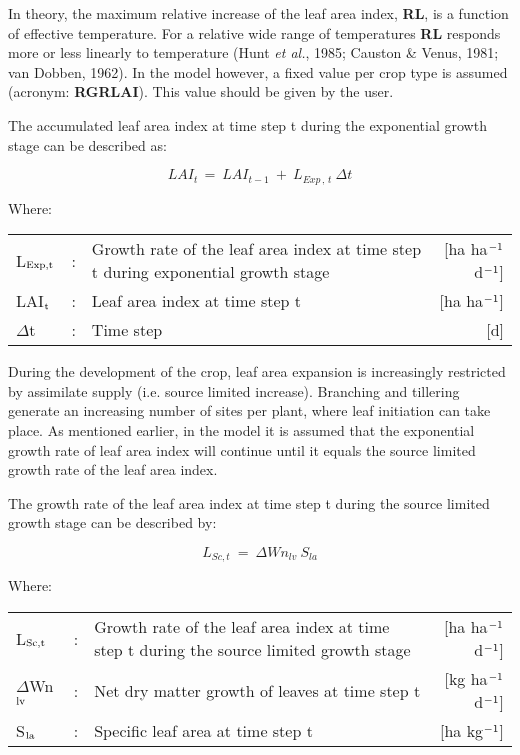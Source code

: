 In theory, the maximum relative increase of the leaf area index, {\bf RL}, is a function of
effective temperature. For a relative wide range of temperatures {\bf RL} responds more or
less linearly to temperature (Hunt {\it et al.}, 1985; Causton \& Venus, 1981; van Dobben,
1962). In the model however, a fixed value per crop type is assumed (acronym: 
{\bf RGRLAI}). This value should be given by the user.

The accumulated leaf area index at time step t during the exponential growth stage can be
described as:

\begin{equation}
\label{eq:5.51}
LAI _{t~} =~LAI _{t-1} ~+~L _{Exp\, ,\, t} ~\Delta t
\end{equation}

Where:\\[5pt]
\begin{tabularx}{\textwidth}{llXr}
	L$_{{\rm Exp,t}}$ &:& Growth rate of the leaf area index at time step t
	during exponential growth stage    &    [ha ha$^{{\rm -1}}$ d$^{{\rm -1}}$]\\
	LAI$_{{\rm t}}$ &:& Leaf area index at time step t   &
	[ha ha$^{{\rm -1}}$]\\
	$\Delta$t &:& Time step   &    [d]
\end{tabularx}

During the development of the crop, leaf area expansion is increasingly restricted by
assimilate supply (i.e. source limited increase). Branching and tillering generate an
increasing number of sites per plant, where leaf initiation can take place. As mentioned
earlier, in the model it is assumed that the exponential growth rate of leaf area index will
continue until it equals the source limited growth rate of the leaf area index.

The growth rate of the leaf area index at time step t during the source limited growth 
stage can be described by:

\begin{equation}
\label{eq:5.52}
L _{Sc,t} ~=~\Delta Wn _{lv} ~S _{la} 
\end{equation}

Where:\\[5pt]
\begin{tabularx}{\textwidth}{llXr}
	L$_{{\rm Sc,t}}$ &:& Growth rate of the leaf area index at time step t
	during the source limited growth stage    &
	[ha ha$^{{\rm -1}}$ d$^{{\rm -1}}$]\\
	$\Delta$Wn$_{{\rm lv}}$ &:& Net dry matter growth of leaves at time step t    &
	[kg ha$^{{\rm -1}}$ d$^{{\rm -1}}$]\\
	S$_{{\rm la}}$ &:& Specific leaf area at time step t   &
	[ha kg$^{{\rm -1}}$]\\
\end{tabularx}

